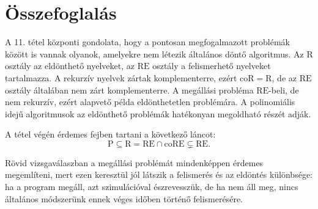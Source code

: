 \section{Összefoglalás}

\begin{summarybox}
A 11. tétel központi gondolata, hogy a pontosan megfogalmazott problémák között is vannak olyanok, amelyekre nem létezik általános döntő algoritmus. Az $\mathrm{R}$ osztály az eldönthető nyelveket, az $\mathrm{RE}$ osztály a felismerhető nyelveket tartalmazza. A rekurzív nyelvek zártak komplementerre, ezért $\mathrm{coR}=\mathrm{R}$, de az $\mathrm{RE}$ osztály általában nem zárt komplementerre. A megállási probléma $\mathrm{RE}$-beli, de nem rekurzív, ezért alapvető példa eldönthetetlen problémára. A polinomiális idejű algoritmusok az eldönthető problémák hatékonyan megoldható részét adják.
\end{summarybox}

A tétel végén érdemes fejben tartani a következő láncot:
\[
  \mathrm{P}\subseteq\mathrm{R}
  =\mathrm{RE}\cap\mathrm{coRE}
  \subsetneq\mathrm{RE}.
\]

Rövid vizsgaválaszban a megállási problémát mindenképpen érdemes megemlíteni, mert ezen keresztül jól látszik a felismerés és az eldöntés különbsége: ha a program megáll, azt szimulációval észrevesszük, de ha nem áll meg, nincs általános módszerünk ennek véges időben történő felismerésére.
